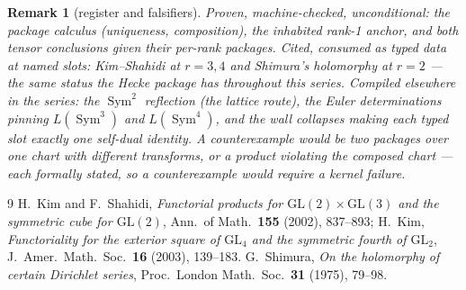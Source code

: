 \documentclass[11pt]{article}
\newtheorem{remark}[theorem]{Remark}
\newcommand{\Sym}{\operatorname{Sym}}
\begin{document}
\begin{remark}[register and falsifiers]
Proven, machine-checked, unconditional: the package calculus (uniqueness, composition),
the inhabited rank-1 anchor, and both tensor conclusions given their per-rank packages.
Cited, consumed as typed data at named slots: Kim--Shahidi at $r=3,4$ and Shimura's
holomorphy at $r=2$ --- the same status the Hecke package has throughout this series.
Compiled elsewhere in the series: the $\Sym^2$ reflection (the lattice route), the
Euler determinations pinning $L(\Sym^3)$ and $L(\Sym^4)$, and the wall collapses making
each typed slot exactly one self-dual identity.  A counterexample would be two packages
over one chart with different transforms, or a product violating the composed chart ---
each formally stated, so a counterexample would require a kernel failure.
\end{remark}

\begin{thebibliography}{9}
 H.~Kim and F.~Shahidi, \emph{Functorial products for
$\mathrm{GL}(2)\times\mathrm{GL}(3)$ and the symmetric cube for $\mathrm{GL}(2)$},
Ann.\ of Math.\ \textbf{155} (2002), 837--893; H.~Kim, \emph{Functoriality for the
exterior square of $\mathrm{GL}_4$ and the symmetric fourth of $\mathrm{GL}_2$},
J.\ Amer.\ Math.\ Soc.\ \textbf{16} (2003), 139--183.
 G.~Shimura, \emph{On the holomorphy of certain Dirichlet series},
Proc.\ London Math.\ Soc.\ \textbf{31} (1975), 79--98.
\end{thebibliography}
\end{document}

